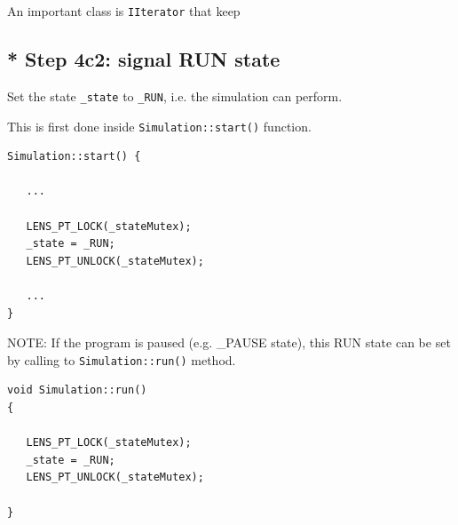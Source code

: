 An important class is \verb!IIterator! that keep

\subsection{* Step 4c2: signal RUN state}
\label{sec:GSL-simulations-part-signal-RUN-state}

Set the state \verb!_state! to \verb!_RUN!, i.e. the simulation can perform.

This is first done inside \verb!Simulation::start()! function.
\begin{verbatim}
Simulation::start() {

   ...
   
   LENS_PT_LOCK(_stateMutex);                                                                                 
   _state = _RUN;                                                                                             
   LENS_PT_UNLOCK(_stateMutex);                                                                               

   ...
}
\end{verbatim}

NOTE: If the program is paused (e.g. \_PAUSE state), this RUN state can be set
by calling to \verb!Simulation::run()! method.
\begin{verbatim} 
void Simulation::run()                                                                                                                                                                                 
{                                                                                                                                                                                                      
                                                                                                                                                                                                       
   LENS_PT_LOCK(_stateMutex);                                                                                 
   _state = _RUN;                                                                                             
   LENS_PT_UNLOCK(_stateMutex);                                                                               
                                                                                                                                                                                                       
}              
\end{verbatim}

